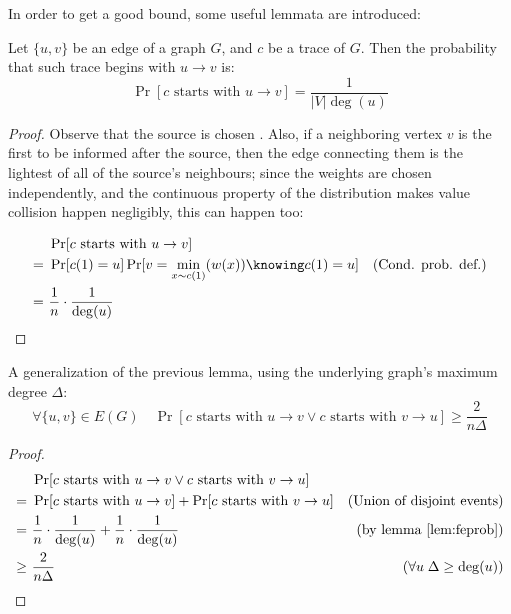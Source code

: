 In order to get a good bound, some useful lemmata are introduced:

\begin{lemma}\label{lem:feprob} Let $\{u, v\}$ be an edge of a graph $G$, and $c$ be a trace of $G$. Then the probability that such trace begins with $u \to v$ is:
    \[
        \Pr[c \text{ starts with } u \to v] = \frac{1}{|V| \deg(u)}
    \]
    
\end{lemma}

\begin{proof}
    Observe that the source is chosen \uar{}. Also, if a neighboring vertex $v$ is the first to be informed after the source, then the edge connecting them is the lightest of all of the source's neighbours; since the weights are chosen independently, and the continuous property of the distribution makes value collision happen negligibly, this can happen \uar{} too: 

    \begin{align*}
         &\ \Pr[c \text{ starts with } u \to v]                                 & \\
        =&\ \Pr[c(1) = u] \Pr[v = \min_{x \sim c(1)}(w(x)) \knowing c(1) = u]   & \text{(Cond. prob. def.)}\\
        =&\ \frac{1}{n} \cdot \frac{1}{\deg(u)}                                 & \\
    \end{align*}
\end{proof}

\begin{lemma}\label{lem:gen-feprob} A generalization of the previous lemma, using the underlying graph's maximum degree $\Delta$:
    \[
        \forall \{u, v\} \in E(G) \quad \Pr[c \text{ starts with } u \to v \vee c \text{ starts with } v \to u] \geq \frac{2}{n \Delta}
    \]
\end{lemma}

\begin{proof}
    \begin{align*}
            &\ \Pr[c \text{ starts with } u \to v \vee c \text{ starts with } v \to u]      & \\
           =&\ \Pr[c \text{ starts with } u \to v] + \Pr[c \text{ starts with } v \to u]    & \text{(Union of disjoint events)} \\
           =&\ \frac{1}{n} \cdot \frac{1}{\deg(u)} + \frac{1}{n} \cdot \frac{1}{\deg(u)}    & \text{(by lemma \ref{lem:feprob})}\\
        \geq&\ \frac{2}{n \Delta}                                                           & (\forall u \; \Delta \geq \deg(u)) \\
    \end{align*}
\end{proof}


